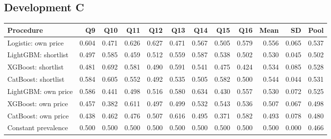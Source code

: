 \subsection*{Development C}
\begingroup\scriptsize\setlength{\tabcolsep}{2.5pt}
\begin{longtable}{@{}p{.26\linewidth}rrrrrrrrrrr@{}}\toprule
Procedure & Q9 & Q10 & Q11 & Q12 & Q13 & Q14 & Q15 & Q16 & Mean & SD & Pool\\\midrule\endhead
Logistic: own price & 0.604 & 0.471 & 0.626 & 0.627 & 0.471 & 0.567 & 0.505 & 0.579 & 0.556 & 0.065 & 0.537\\
LightGBM: shortlist & 0.497 & 0.585 & 0.459 & 0.512 & 0.559 & 0.587 & 0.538 & 0.502 & 0.530 & 0.045 & 0.502\\
XGBoost: shortlist & 0.481 & 0.692 & 0.581 & 0.490 & 0.591 & 0.541 & 0.475 & 0.424 & 0.534 & 0.085 & 0.528\\
CatBoost: shortlist & 0.584 & 0.605 & 0.552 & 0.492 & 0.535 & 0.505 & 0.582 & 0.500 & 0.544 & 0.044 & 0.531\\
LightGBM: own price & 0.586 & 0.441 & 0.498 & 0.516 & 0.580 & 0.634 & 0.430 & 0.557 & 0.530 & 0.072 & 0.525\\
XGBoost: own price & 0.457 & 0.382 & 0.611 & 0.497 & 0.499 & 0.532 & 0.543 & 0.536 & 0.507 & 0.067 & 0.498\\
CatBoost: own price & 0.438 & 0.462 & 0.476 & 0.507 & 0.616 & 0.495 & 0.371 & 0.582 & 0.493 & 0.078 & 0.480\\
Constant prevalence & 0.500 & 0.500 & 0.500 & 0.500 & 0.500 & 0.500 & 0.500 & 0.500 & 0.500 & 0.000 & 0.466\\
\bottomrule\end{longtable}\endgroup
